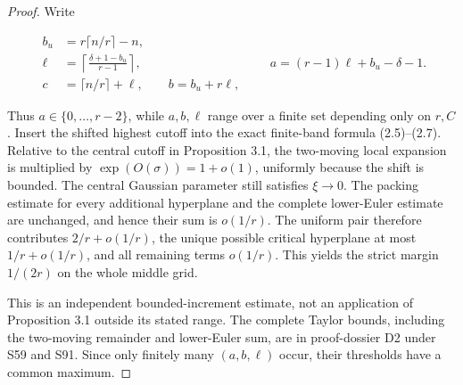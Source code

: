 \documentclass[10pt]{article}
\begin{document}
\begin{proof}


Write

\[
 \begin{aligned}
 b_u&=r\lceil n/r\rceil-n,\\
 \ell&=\left\lceil\frac{\delta+1-b_u}{r-1}\right\rceil,\\
 c&=\lceil n/r\rceil+\ell,\qquad b=b_u+r\ell,
 \end{aligned}
 \qquad
 a=(r-1)\ell+b_u-\delta-1. \tag{3.17b}
\]

Thus $a\in\{0,\ldots,r-2\}$, while $a,b,\ell$ range over a finite set
depending only on $r,C$.  Insert the shifted highest cutoff into the exact
finite-band formula (2.5)--(2.7).  Relative to the central cutoff in
Proposition 3.1, the two-moving local expansion is multiplied by
$\exp(O(\sigma))=1+o(1)$, uniformly because the shift is bounded.  The
central Gaussian parameter still satisfies $\xi\to0$.  The packing estimate
for every additional hyperplane and the complete lower-Euler estimate are
unchanged, and hence their sum is $o(1/r)$.  The uniform pair therefore
contributes $2/r+o(1/r)$, the unique possible critical hyperplane at most
$1/r+o(1/r)$, and all remaining terms $o(1/r)$.  This yields the strict
margin $1/(2r)$ on the whole middle grid.

This is an independent bounded-increment estimate, not an application of
Proposition 3.1 outside its stated range.  The complete Taylor bounds,
including the two-moving remainder and lower-Euler sum, are in proof-dossier
D2 under S59 and S91.  Since only finitely many $(a,b,\ell)$ occur, their
thresholds have a common maximum.
\end{proof}
\end{document}
